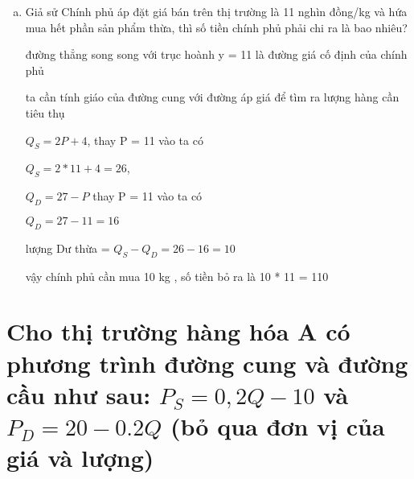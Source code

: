 \begin{enumerate}[(a)]
    \item Giả sử Chính phủ áp đặt giá bán trên thị trường là 11 nghìn đồng/kg và hứa mua hết phần
          sản phẩm thừa, thì số tiền chính phủ phải chi ra là bao nhiêu?

    đường thẳng song song với trục hoành
    y = 11 là đường giá cố định của chính phủ

    ta cần tính giáo của đường cung với đường áp giá để tìm ra lượng hàng cần tiêu thụ

    $Q_S = 2P + 4$,
    thay P  = 11 vào ta có 

    $Q_S = 2 * 11 + 4 = 26$,

    $Q_D = 27 - P$
    thay P  = 11 vào ta có 

    $Q_D = 27 - 11 = 16$

    lượng Dư thừa = $Q_S - Q_D = 26 - 16 = 10$

    vậy chính phủ cần mua 10 kg
    , số tiền bỏ ra là 10 * 11 = 110 

\end{enumerate}


\section{ Cho thị trường hàng hóa A có phương trình đường cung và đường cầu như 
sau: $P_S = 0,2Q - 10$ và $P_D = 20 - 0.2Q$ (bỏ qua đơn vị của giá và lượng)}

